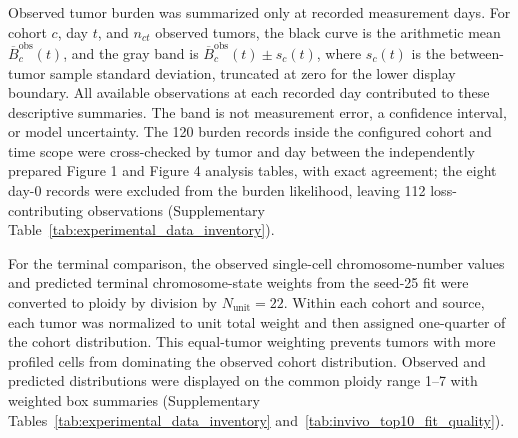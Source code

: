 \documentclass[11pt]{article}
\begin{document}
Observed tumor burden was summarized only at recorded measurement days. For cohort \(c\), day \(t\), and \(n_{ct}\) observed tumors, the black curve is the arithmetic mean \(\overline{B}^{\mathrm{obs}}_c(t)\), and the gray band is \(\overline{B}^{\mathrm{obs}}_c(t)\pm s_c(t)\), where \(s_c(t)\) is the between-tumor sample standard deviation, truncated at zero for the lower display boundary. All available observations at each recorded day contributed to these descriptive summaries. The band is not measurement error, a confidence interval, or model uncertainty. The 120 burden records inside the configured cohort and time scope were cross-checked by tumor and day between the independently prepared Figure 1 and Figure 4 analysis tables, with exact agreement; the eight day-0 records were excluded from the burden likelihood, leaving 112 loss-contributing observations (Supplementary Table~\ref{tab:experimental_data_inventory}).

For the terminal comparison, the observed single-cell chromosome-number values and predicted terminal chromosome-state weights from the seed-25 fit were converted to ploidy by division by \(N_{\mathrm{unit}}=22\). Within each cohort and source, each tumor was normalized to unit total weight and then assigned one-quarter of the cohort distribution. This equal-tumor weighting prevents tumors with more profiled cells from dominating the observed cohort distribution. Observed and predicted distributions were displayed on the common ploidy range 1--7 with weighted box summaries (Supplementary Tables~\ref{tab:experimental_data_inventory} and~\ref{tab:invivo_top10_fit_quality}).
\end{document}
